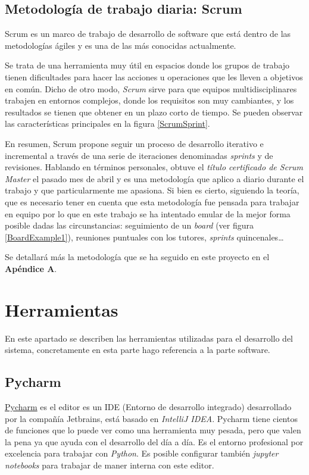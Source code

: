 \subsection{Metodología de trabajo diaria: Scrum}\label{metodologias_scrum}
Scrum es un marco de trabajo de desarrollo de software que está dentro de las metodologías ágiles y es una de las más conocidas actualmente. 

Se trata de una herramienta muy útil en espacios donde los grupos de trabajo tienen dificultades para hacer las acciones u operaciones que les lleven a objetivos en común. Dicho de otro modo, \textit{Scrum} sirve para que equipos multidisciplinares trabajen en entornos complejos, donde los requisitos son muy cambiantes, y los resultados se tienen que obtener en un plazo corto de tiempo.  Se pueden observar las características principales en la figura \ref{ScrumSprint}.



En resumen, Scrum propone seguir un proceso de desarrollo iterativo e incremental a través de una serie de iteraciones denominadas \textit{sprints} y de revisiones. 
Hablando en términos personales, obtuve el \textit{título certificado de Scrum Master} el pasado mes de abril y es una metodología que aplico a diario durante el trabajo y que particularmente me apasiona. Si bien es cierto, siguiendo la teoría, que es necesario tener en cuenta que esta metodología fue pensada para trabajar en equipo por lo que en este trabajo se ha intentado emular de la mejor forma posible dadas las circunstancias: seguimiento de un \emph{board} (ver figura \ref{BoardExample1}), reuniones puntuales con los tutores, \emph{sprints} quincenales\ldots


Se detallará más la metodología que se ha seguido en este proyecto en el \textbf{Apéndice A}.
\section{Herramientas}\label{herramientas}
En este apartado se describen las herramientas utilizadas para el desarrollo del sistema, concretamente en esta parte hago referencia a la parte software.

\subsection{Pycharm}\label{herramientas_pycharm}
\href{https://www.jetbrains.com/pycharm/}{Pycharm} es el editor es un IDE (Entorno de desarrollo integrado) desarrollado por la compañía Jetbrains, está basado en\textit{ IntelliJ IDEA}. Pycharm tiene cientos de funciones que lo puede ver como una herramienta muy pesada, pero que valen la pena ya que ayuda con el desarrollo del día a día. Es el entorno profesional por excelencia para trabajar con \textit{Python}. Es posible configurar también\textit{ jupyter notebooks} para trabajar de maner interna con este editor.

